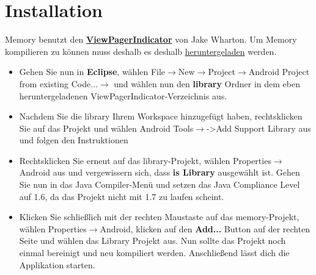 \documentclass[11pt,a4paper]{article}
\begin{document}
\section{Installation}
Memory benutzt den \textbf{\href{https://github.com/JakeWharton/Android-ViewPagerIndicator}{ViewPagerIndicator}} von Jake Wharton. Um Memory kompilieren zu können muss deshalb es deshalb \href{https://github.com/JakeWharton/Android-ViewPagerIndicator/tarball/master}{heruntergeladen} werden.
\begin{itemize}
\item Gehen Sie nun in \textbf{Eclipse}, wählen File${\longrightarrow}$New${\longrightarrow}$Project${\longrightarrow}$Android Project from existing Code...${\longrightarrow}$ und wählen nun den \textbf{library} Ordner in dem eben heruntergeladenen ViewPagerIndicator-Verzeichnis aus.
\item Nachdem Sie die library Ihrem Workspace hinzugefügt haben, rechtsklicken Sie auf das Projekt und wählen Android Tools${\longrightarrow}$->Add Support Library aus und folgen den Instruktionen
\item Rechtsklicken Sie erneut auf das library-Projekt, wählen Properties${\longrightarrow}$Android aus und vergewissern sich, dass \textbf{is Library} ausgewählt ist. Gehen Sie nun in das Java Compiler-Menü und setzen das Java Compliance Level auf 1.6, da das Projekt nicht mit 1.7 zu laufen scheint.
\item Klicken Sie schließlich mit der rechten Maustaste auf das memory-Projekt, wählen Properties${\longrightarrow}$Android, klicken auf den \textbf{Add...} Button auf der rechten Seite und wählen das Library Projekt aus. Nun sollte das Projekt noch einmal bereinigt und neu kompiliert werden. Anschließend lässt dich die Applikation starten.
\end{itemize}
\end{document}
